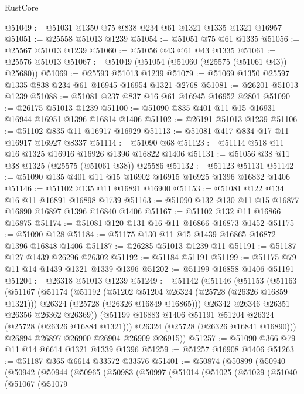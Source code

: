 \begin{lexlean}{RustCore}
\begin{coremodule}
@51049 := @51031 @1350 @75 @838 @234 @61 @1321 @1335 @1321 @16957
@51051 := @25558 @51013 @1239
@51054 := @51051 @75 @61 @1335
@51056 := @25567 @51013 @1239
@51060 := @51056 @43 @61 @43 @1335
@51061 := @25576 @51013
@51067 := @51049 (@51054 (@51060 (@25575 (@51061 @43)) @25680))
@51069 := @25593 @51013 @1239
@51079 := @51069 @1350 @25597 @1335 @838 @234 @61 @16945 @16954 @1321 @2768
@51081 := @26201 @51013 @1239
@51088 := @51081 @237 @837 @16 @61 @16945 @16952 @2801
@51090 := @26175 @51013 @1239
@51100 := @51090 @835 @401 @11 @15 @16931 @16944 @16951 @1396 @16814 @1406
@51102 := @26191 @51013 @1239
@51106 := @51102 @835 @11 @16917 @16929
@51113 := @51081 @417 @834 @17 @11 @16917 @16927 @8337
@51114 := @51090 @68
@51123 := @51114 @518 @11 @16 @1325 @16916 @16926 @1396 @16822 @1406
@51131 := @51056 @38 @11 @38 @1325 (@25575 (@51061 @38)) @25586
@51132 := @51123 @51131
@51142 := @51090 @135 @401 @11 @15 @16902 @16915 @16925 @1396 @16832 @1406
@51146 := @51102 @135 @11 @16891 @16900
@51153 := @51081 @122 @134 @16 @11 @16891 @16898 @1739
@51163 := @51090 @132 @130 @11 @15 @16877 @16890 @16897 @1396 @16840 @1406
@51167 := @51102 @132 @11 @16866 @16875
@51174 := @51081 @120 @131 @16 @11 @16866 @16873 @1452
@51175 := @51090 @128
@51184 := @51175 @130 @11 @15 @1439 @16865 @16872 @1396 @16848 @1406
@51187 := @26285 @51013 @1239 @11
@51191 := @51187 @127 @1439 @26296 @26302
@51192 := @51184 @51191
@51199 := @51175 @79 @11 @14 @1439 @1321 @1339 @1396
@51202 := @51199 @16858 @1406 @51191
@51204 := @26318 @51013 @1239
@51249 := @51142
    (@51146
      (@51153
        (@51163
          (@51167
            (@51174
              (@51192
                (@51202 @51204 @26324 (@25728 (@26326 @16859 @1321)))
                @26324
                (@25728 (@26326 @16849 @16865)))
              @26342
              @26346
              @26351
              @26356
              @26362
              @26369))
          (@51199 @16883 @1406 @51191 @51204 @26324 (@25728 (@26326 @16884 @1321)))
          @26324
          (@25728 (@26326 @16841 @16890)))
        @26894
        @26897
        @26900
        @26904
        @26909
        @26915))
@51257 := @51090 @366 @79 @11 @14 @6614 @1321 @1339 @1396
@51259 := @51257 @16908 @1406
@51263 := @51187 @365 @6614 @33572 @33576
@51401 := @50874
    (@50899
      (@50940
        (@50942
          (@50944
            (@50965
              (@50983
                (@50997
                  (@51014
                    (@51025
                      (@51029
                        (@51040
                          (@51067
                            (@51079

\end{coremodule}
\end{lexlean}
